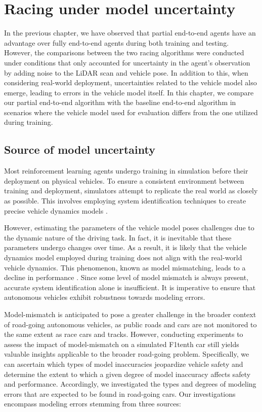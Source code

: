 \chapter{Racing under model uncertainty}\label{chp:racing}


In the previous chapter, we have observed that partial end-to-end agents have an advantage over fully end-to-end agents during both training and testing.
However, the comparisons between the two racing algorithms were conducted under conditions that only accounted for uncertainty in the agent's observation by adding noise to the LiDAR scan and vehicle pose. 
In addition to this, when considering real-world deployment, uncertainties related to the vehicle model also emerge, leading to errors in the vehicle model itself. 
In this chapter, we compare our partial end-to-end algorithm with the baseline end-to-end algorithm in scenarios where the vehicle model used for evaluation differs from the one utilized during training.


\section{Source of model uncertainty}


Most reinforcement learning agents undergo training in simulation before their deployment on physical vehicles. 
To ensure a consistent environment between training and deployment, simulators attempt to replicate the real world as closely as possible.
This involves employing system identification techniques to create precise vehicle dynamics models \cite{Zhou2020}.


However, estimating the parameters of the vehicle model poses challenges due to the dynamic nature of the driving task. 
In fact, it is inevitable that these parameters undergo changes over time.
As a result, it is likely that the vehicle dynamics model employed during training does not align with the real-world vehicle dynamics. 
This phenomenon, known as model mismatching, leads to a decline in performance \cite{Ghignone2022}. 
Since some level of model mismatch is always present, accurate system identification alone is insufficient. 
It is imperative to ensure that autonomous vehicles exhibit robustness towards modeling errors.


Model-mismatch is anticipated to pose a greater challenge in the broader context of road-going autonomous vehicles, as public roads and cars are not monitored to the same extent as race cars and tracks.
However, conducting experiments to assess the impact of model-mismatch on a simulated F1tenth car still yields valuable insights applicable to the broader road-going problem. 
Specifically, we can ascertain which types of model inaccuracies jeopardize vehicle safety and determine the extent to which a given degree of model inaccuracy affects safety and performance. 
Accordingly, we investigated the types and degrees of modeling errors that are expected to be found in road-going cars. 
Our investigations encompass modeling errors stemming from three sources:


